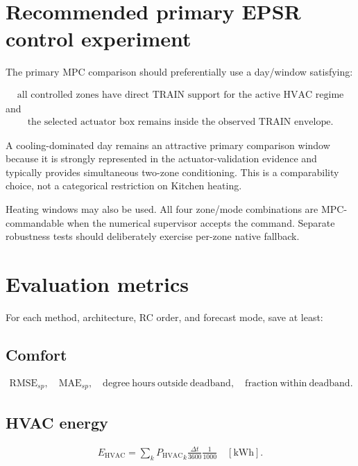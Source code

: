 \documentclass[11pt]{article}
\newcommand{\PHVAC}{P_{\mathrm{HVAC}}}
\newcommand{\dt}{\Delta t}
\begin{document}
\section{Recommended primary EPSR control experiment}

The primary MPC comparison should preferentially use a day/window satisfying:

\begin{align}
\boxed{\text{all controlled zones have direct TRAIN support for the active HVAC regime}}
\end{align}
and
\begin{align}
\boxed{\text{the selected actuator box remains inside the observed TRAIN envelope.}}
\end{align}

A cooling-dominated day remains an attractive primary comparison window
because it is strongly represented in the actuator-validation evidence and
typically provides simultaneous two-zone conditioning.  This is a
comparability choice, not a categorical restriction on Kitchen heating.

Heating windows may also be used.  All four zone/mode combinations are
MPC-commandable when the numerical supervisor accepts the command.  Separate
robustness tests should deliberately exercise per-zone native fallback.

\section{Evaluation metrics}

For each method, architecture, RC order, and forecast mode, save at least:

\subsection*{Comfort}
\begin{align}
\mathrm{RMSE}_{sp},
\quad
\mathrm{MAE}_{sp},
\quad
\mathrm{degree\ hours\ outside\ deadband},
\quad
\mathrm{fraction\ within\ deadband}.
\end{align}

\subsection*{HVAC energy}
\begin{align}
\boxed{
E_{\mathrm{HVAC}}
=
\sum_k
{\PHVAC}_k
\frac{\dt}{3600}
\frac{1}{1000}
\quad[\mathrm{kWh}].
}
\tag{6.79}
\end{align}
\end{document}
